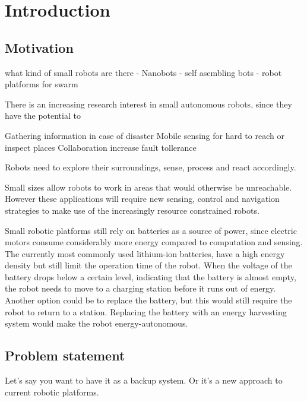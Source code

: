 \chapter{Introduction}
\label{chp:introduction}

\section{Motivation}

what kind of small robots are there
- Nanobots
- self asembling bots
- robot platforms for swarm





There is an increasing research interest in small autonomous robots, since they have the potential to 



Gathering information in case of disaster
Mobile sensing for hard to reach or inspect places
Collaboration increase fault tollerance


Robots need to explore their surroundings, sense, process and react accordingly.	


Small sizes allow robots to work in areas that would otherwise be unreachable. 
However these applications will require new sensing, control and navigation strategies to make use of the increasingly resource constrained robots.

Small robotic platforms still rely on batteries as a source of power, since electric motors consume considerably more energy compared to computation and sensing.
The currently most commonly used lithium-ion batteries, have a high energy density but still limit the operation time of the robot.
When the voltage of the battery drops below a certain level, indicating that the battery is almost empty, the robot needs to move to a charging station before it runs out of energy.
Another option could be to replace the battery, but this would still require the robot to return to a station.
Replacing the battery with an energy harvesting system would make the robot energy-autonomous. 


\section{Problem statement}

Let's say you want to have it as a backup system.
Or it's a new approach to current robotic platforms.

